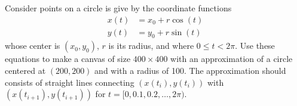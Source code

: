 \label{canvas:circle}
Consider points on a circle is give by the coordinate functions
\begin{align}
  x(t) &= x_0+r\cos(t)\\
  y(t) &= y_0+r\sin(t)
\end{align}
whose center is $(x_0,y_0)$, $r$ is its radius, and where $0\leq t < 2\pi$. Use these equations to make a canvas of size $400\times 400$ with an approximation of a circle centered at $(200,200)$ and with a radius of 100. The approximation should consists of straight lines connecting $(x(t_i),y(t_i))$ with $(x(t_{i+1}),y(t_{i+1}))$ for $t = [0, 0.1, 0.2, \ldots, 2\pi)$.
